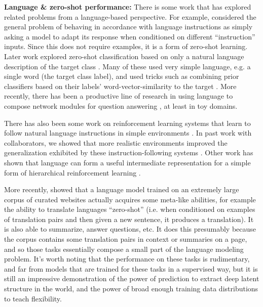 \textbf{Language \& zero-shot performance:} There is some work that has explored related problems from a language-based perspective. For example, \citet{Larochelle2008} considered the general problem of behaving in accordance with language instructions as simply asking a model to adapt its response when conditioned on different ``instruction'' inputs. Since this does not require examples, it is a form of zero-shot learning. Later work explored zero-shot classification based on only a natural language description of the target class \citep{Socher2013,Romera-Paredes2015, Xian2018}. Many of these used very simple language, e.g. a single word (the target class label), and used tricks such as combining prior classifiers based on their labels' word-vector-similarity to the target \citep[e.g.]{Norouzi2014, Changpinyo2016}. More recently, there has been a productive line of research in using language to compose network modules for question answering \citep{Andreas, Andreasa}, at least in toy domains. \par
There has also been some work on reinforcement learning systems that learn to follow natural language instructions in simple environments \citep{Hermann2017, Oh2017a}. In past work with collaborators, we showed that more realistic environments improved the generalization exhibited by these instruction-following systems \citep{Hill2019a}. Other work has shown that language can form a useful intermediate representation for a simple form of hierarchical reinforcement learning \citep{Jiang2019}. \par
More recently, \citet{Radford2019} showed that a language model trained on an extremely large corpus of curated websites actually acquires some meta-like abilities, for example the ability to translate languages ``zero-shot'' (i.e. when conditioned on examples of translation pairs and then given a new sentence, it produces a translation). It is also able to summarize, answer questions, etc. It does this presumably because the corpus contains some translation pairs in context or summaries on a page, and so those tasks essentially compose a small part of the language modeling problem. It's worth noting that the performance on these tasks is rudimentary, and far from models that are trained for these tasks in a supervised way, but it is still an impressive demonstration of the power of prediction to extract deep latent structure in the world, and the power of broad enough training data distributions to teach flexibility. \par  

